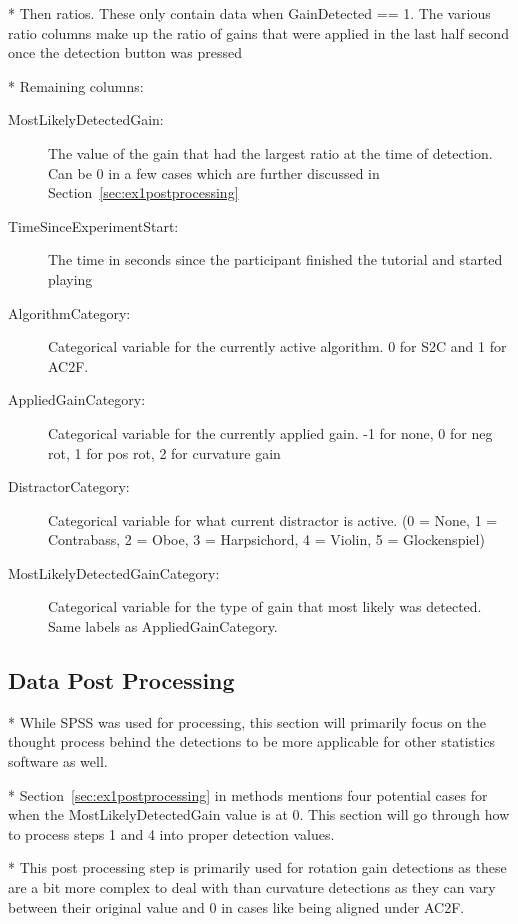 * Then ratios. These only contain data when GainDetected == 1. The various ratio columns make up the ratio of gains that were applied in the last half second once the detection button was pressed

* Remaining columns:
\begin{description}
   \item[MostLikelyDetectedGain: ] The value of the gain that had the largest ratio at the time of detection. Can be 0 in a few cases which are further discussed in Section~\ref{sec:ex1postprocessing}
   \item[TimeSinceExperimentStart: ] The time in seconds since the participant finished the tutorial and started playing
   \item[AlgorithmCategory: ] Categorical variable for the currently active algorithm. 0 for S2C and 1 for AC2F.
   \item[AppliedGainCategory: ] Categorical variable for the currently applied gain. -1 for none, 0 for neg rot, 1 for pos rot, 2 for curvature gain
   \item[DistractorCategory: ] Categorical variable for what current distractor is active. (0 = None, 1 = Contrabass, 2 = Oboe, 3 = Harpsichord, 4 = Violin, 5 = Glockenspiel)
   \item[MostLikelyDetectedGainCategory: ] Categorical variable for the type of gain that most likely was detected. Same labels as AppliedGainCategory.
\end{description}


\subsection{Data Post Processing}\label{sec:ex1postprocessingdetails}
* While SPSS was used for processing, this section will primarily focus on the thought process behind the detections to be more applicable for other statistics software as well. 

* Section~\ref{sec:ex1postprocessing} in methods mentions four potential cases for when the MostLikelyDetectedGain value is at 0. This section will go through how to process steps 1 and 4 into proper detection values. 

* This post processing step is primarily used for rotation gain detections as these are a bit more complex to deal with than curvature detections as they can vary between their original value and 0 in cases like being aligned under AC2F. 

